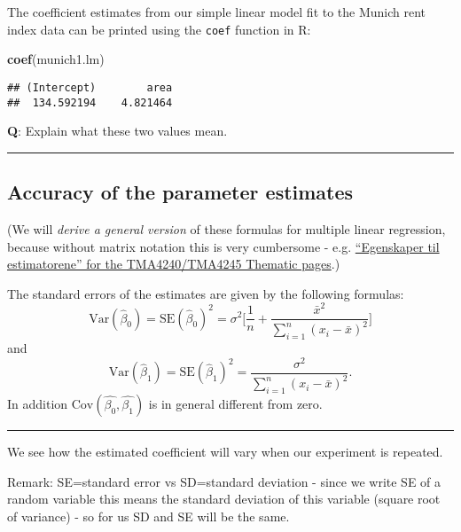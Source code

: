 \documentclass[]{article}
\newenvironment{Shaded}{\begin{snugshade}}{\end{snugshade}}
\newcommand{\KeywordTok}[1]{\textcolor[rgb]{0.13,0.29,0.53}{\textbf{#1}}}
\newcommand{\NormalTok}[1]{#1}
\begin{document}
The coefficient estimates from our simple linear model fit to the Munich
rent index data can be printed using the \texttt{coef} function in R:

\begin{Shaded}
\begin{Highlighting}[]
\KeywordTok{coef}\NormalTok{(munich1.lm)}
\end{Highlighting}
\end{Shaded}

\begin{verbatim}
## (Intercept)        area 
##  134.592194    4.821464
\end{verbatim}

\textbf{Q}: Explain what these two values mean.

\begin{center}\rule{0.5\linewidth}{\linethickness}\end{center}

\hypertarget{accuracy-of-the-parameter-estimates}{%
\subsection{Accuracy of the parameter
estimates}\label{accuracy-of-the-parameter-estimates}}

(We will \emph{derive a general version} of these formulas for multiple
linear regression, because without matrix notation this is very
cumbersome - e.g.
\href{https://wiki.math.ntnu.no/tma4245/tema/begreper/regression}{``Egenskaper
til estimatorene'' for the TMA4240/TMA4245 Thematic pages}.)

The standard errors of the estimates are given by the following
formulas:
\[\text{Var}(\hat{\beta}_0)=\text{SE}(\hat{\beta}_0)^2 = \sigma^2 \Big [ \frac{1}{n} + \frac{\bar{x}^2}{\sum_{i=1}^n (x_i -\bar{x})^2} \Big]\]
and
\[\text{Var}(\hat{\beta}_1)=\text{SE}(\hat{\beta}_1)^2 = \frac{\sigma^2}{\sum_{i=1}^n (x_i-\bar{x})^2}.\]
In addition \(\text{Cov}(\hat{\beta_0},\hat{\beta_1})\) is in general
different from zero.

\begin{center}\rule{0.5\linewidth}{\linethickness}\end{center}

We see how the estimated coefficient will vary when our experiment is
repeated.

Remark: SE=standard error vs SD=standard deviation - since we write SE
of a random variable this means the standard deviation of this variable
(square root of variance) - so for us SD and SE will be the same.
\end{document}
